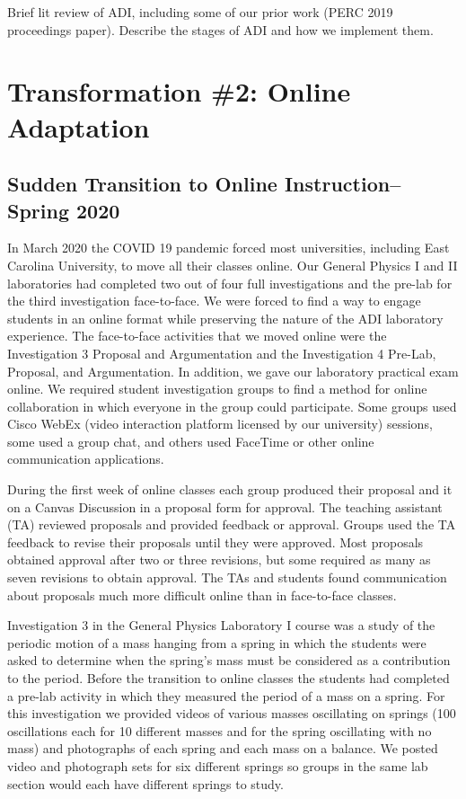 \documentclass[aip, numerical, preprint]{revtex4-2}
\begin{document}
Brief lit review of ADI, including some of our prior work (PERC 2019 proceedings paper).
Describe the stages of ADI and how we implement them.

\section{Transformation \#2: Online Adaptation}

\subsection{Sudden Transition to Online Instruction--Spring 2020}

In March 2020 the COVID 19 pandemic forced most universities, including East Carolina University, to move all their classes online. Our General Physics I and II laboratories had completed two out of four full investigations and the pre-lab for the third investigation face-to-face. We were forced to find a way to engage students in an online format while preserving the nature of the ADI laboratory experience. The face-to-face activities that we moved online were the Investigation 3 Proposal and Argumentation and the Investigation 4 Pre-Lab, Proposal, and Argumentation. In addition, we gave our laboratory practical exam online. We required student investigation groups to find a method for online collaboration in which everyone in the group could participate. Some groups used Cisco WebEx (video interaction platform licensed by our university) sessions, some used a group chat, and others used FaceTime or other online communication applications. 

During the first week of online classes each group produced their proposal and it on a Canvas Discussion in a proposal form for approval. The teaching assistant (TA) reviewed proposals and provided feedback or approval. Groups used the TA feedback to revise their proposals until they were approved. Most proposals obtained approval after two or three revisions, but some required as many as seven revisions to obtain approval. The TAs and students found communication about proposals much more difficult online than in face-to-face classes. 

Investigation 3 in the General Physics Laboratory I course was a study of the periodic motion of a mass hanging from a spring in which the students were asked to determine when the spring's mass must be considered as a contribution to the period. Before the transition to online classes the students had completed a pre-lab activity in which they measured the period of a mass on a spring. For this investigation we provided videos of various masses oscillating on springs (100 oscillations each for 10 different masses and for the spring oscillating with no mass) and photographs of each spring and each mass on a balance. We posted video and photograph sets for six different springs so groups in the same lab section would each have different springs to study. 
\end{document}

